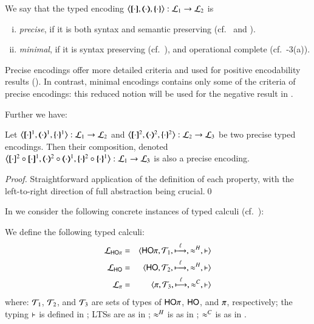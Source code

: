 \begin{definition}\myrm
	\label{def:goodenc}
	We say that  the typed encoding 
	$\enco{\map{\cdot}, \mapt{\cdot}, \mapa{\cdot}}: \tyl{L}_1 \to \tyl{L}_2$ is 
%
	\begin{enumerate}[(i)]
		\item	\emph{precise}, if it is both syntax and semantic preserving
			(cf.~ and ).

		\item	\emph{minimal}, if it is syntax preserving 
			(cf.~),
			and operational complete (cf.~-3(a)).
	\end{enumerate}
\end{definition}

Precise encodings offer more detailed criteria and used for positive 
encodability results ().
In contrast, minimal encodings contains only 
some of the criteria of precise encodings:    
this reduced notion will be used 
for the negative result in . 

Further we have:
\begin{proposition}\myrm
	\label{prop:enc_composability}
	Let %
	$\enco{\pmap{\cdot}{1}, \tmap{\cdot}{1}, \mapa{\cdot}^{1}}: \tyl{L}_1 \to \tyl{L}_2$
	and 
	$\enco{\pmap{\cdot}{2}, \tmap{\cdot}{2}, \mapa{\cdot}^{2}}: \tyl{L}_2 \to \tyl{L}_3$
	be two precise typed encodings.
	Then their composition, denoted 
	$\enco{\pmap{\cdot}{2} \circ \pmap{\cdot}{1}, \tmap{\cdot}{2} \circ \tmap{\cdot}{1}, \mapa{\cdot}^{2}\circ \mapa{\cdot}^{1}}: \tyl{L}_1 \to \tyl{L}_3$
	is also a precise encoding.
\end{proposition}

\begin{proof}
	Straightforward application of the definition of each property, with the left-to-right direction of
	full abstraction being crucial.\qed
\end{proof}

In  %
we consider the following concrete instances of typed calculi
(cf.~):


\begin{definition}\myrm
	We define the following  typed calculi:
	\begin{eqnarray*}
	\mathcal{L}_{\mathsf{HO}\pi}&=&\langle \mathsf{HO}\pi, {\cal{T}}_1, \stackrel{\ell}{\longmapsto}, \approx^{H}, \vdash \rangle \\
	\mathcal{L}_{\mathsf{HO}}&=&\langle \mathsf{HO}, {\cal{T}}_2, \stackrel{\ell}{\longmapsto}, \approx^{H}, \vdash \rangle \\
	\mathcal{L}_{\pi}&=&\langle \pi, {\cal{T}}_3, \stackrel{\ell}{\longmapsto}, \approx^{C}, \vdash \rangle
	\end{eqnarray*}
	where: 
	${\cal{T}}_1$, ${\cal{T}}_2$, 
	and ${\cal{T}}_3$
	are sets of types of $\mathsf{HO}\pi$, $\mathsf{HO}$, and $\pi$, respectively;
	the typing $\vdash$ is defined in 
	;  
	LTSs are as in ;
	$\approx^{H}$ is as in ; 
	$\approx^{C}$ is as in .
\end{definition}


